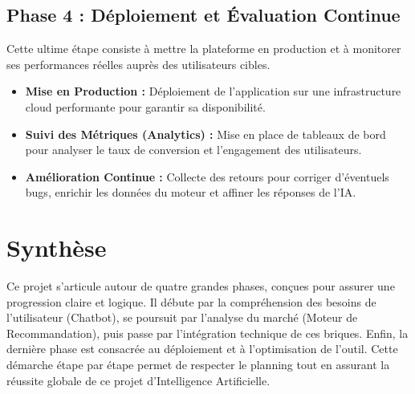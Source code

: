 \documentclass[a4paper, 11pt]{article}
\begin{document}
\subsection*{Phase 4 : Déploiement et Évaluation Continue}
Cette ultime étape consiste à mettre la plateforme en production et à monitorer ses performances réelles auprès des utilisateurs cibles.
\begin{itemize}[label=\textbullet]
    \item \textbf{Mise en Production :} Déploiement de l'application sur une infrastructure cloud performante pour garantir sa disponibilité.
    \item \textbf{Suivi des Métriques (Analytics) :} Mise en place de tableaux de bord pour analyser le taux de conversion et l'engagement des utilisateurs.
    \item \textbf{Amélioration Continue :} Collecte des retours pour corriger d'éventuels bugs, enrichir les données du moteur et affiner les réponses de l'IA.
\end{itemize}

\vspace{0.3cm}

\section*{Synthèse}
Ce projet s'articule autour de quatre grandes phases, conçues pour assurer une progression claire et logique. Il débute par la compréhension des besoins de l'utilisateur (Chatbot), se poursuit par l'analyse du marché (Moteur de Recommandation), puis passe par l'intégration technique de ces briques. Enfin, la dernière phase est consacrée au déploiement et à l'optimisation de l'outil. Cette démarche étape par étape permet de respecter le planning tout en assurant la réussite globale de ce projet d'Intelligence Artificielle.
\end{document}
